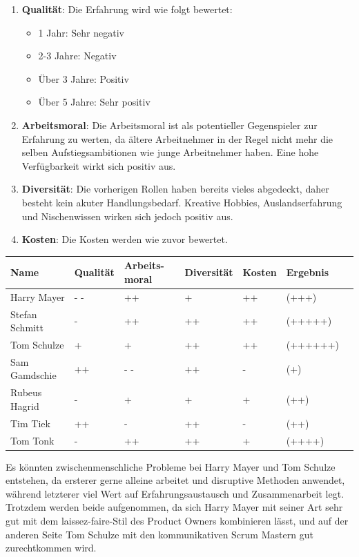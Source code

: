 \begin{enumerate}
  \item \textbf{Qualität}:
    Die Erfahrung wird wie folgt bewertet:
    \begin{itemize}
      \item 1 Jahr: Sehr negativ
      \item 2-3 Jahre: Negativ
      \item Über 3 Jahre: Positiv
      \item Über 5 Jahre: Sehr positiv
    \end{itemize}

  \item \textbf{Arbeitsmoral}:
    Die Arbeitsmoral ist als potentieller Gegenspieler zur Erfahrung zu werten, da ältere Arbeitnehmer in der Regel nicht mehr die selben Aufstiegsambitionen wie junge Arbeitnehmer haben. Eine hohe Verfügbarkeit wirkt sich positiv aus.

  \item \textbf{Diversität}:
    Die vorherigen Rollen haben bereits vieles abgedeckt, daher besteht kein akuter Handlungsbedarf. Kreative Hobbies, Auslandserfahrung und Nischenwissen wirken sich jedoch positiv aus.

  \item \textbf{Kosten}:
    Die Kosten werden wie zuvor bewertet.
    
\end{enumerate}

\begin{center}
\small
\begin{tabularx}{\textwidth}{|l|X|X|X|X|X|X|}
\hline
\textbf{Name} & \textbf{Qualität} & \textbf{Arbeits-moral} & \textbf{Diversität} & \textbf{Kosten} & \textbf{Ergebnis} \\
\hline
Harry Mayer & - - & ++ & + & ++& (+++) \\
\hline
Stefan Schmitt & - & ++ & ++ & ++& (+++++) \\
\hline
Tom Schulze & + & + & ++ & ++&  (++++++) \\
\hline
Sam Gamdschie & ++ & - - & ++ & - & (+) \\
\hline
Rubeus Hagrid & - & + & + & + & (++) \\
\hline
Tim Tiek & ++ & - & ++ & - & (++) \\
\hline
Tom Tonk & - & ++ & ++ & + & (++++) \\
\hline
\end{tabularx}
\end{center}
Es könnten zwischenmenschliche Probleme bei Harry Mayer und Tom Schulze entstehen, da ersterer gerne alleine arbeitet und disruptive Methoden anwendet, während letzterer viel Wert auf Erfahrungsaustausch und Zusammenarbeit legt. Trotzdem werden beide aufgenommen, da sich Harry Mayer mit seiner Art sehr gut mit dem laissez-faire-Stil des Product Owners kombinieren lässt, und auf der anderen Seite Tom Schulze mit den kommunikativen Scrum Mastern gut zurechtkommen wird.

